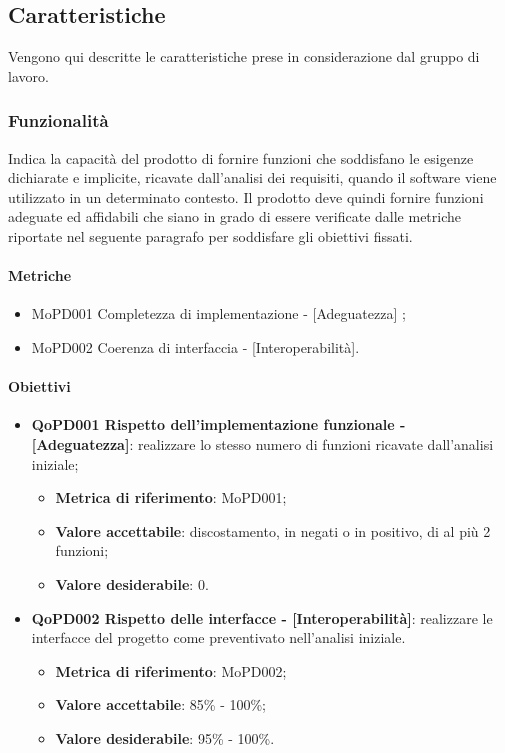 \documentclass[../piano-di-qualifica.tex]{subfiles}
\begin{document}
\subsection{Caratteristiche}%
\label{sub:caratteristiche}
Vengono qui descritte le caratteristiche prese in considerazione dal gruppo di lavoro.

\subsubsection{Funzionalità}%
\label{sub:funzionalita}
Indica la capacità del prodotto di fornire funzioni che soddisfano le esigenze dichiarate e implicite, ricavate dall'analisi dei requisiti, quando il software viene utilizzato in un determinato contesto.
Il prodotto deve quindi fornire funzioni adeguate ed affidabili che siano in grado di essere verificate dalle metriche riportate nel seguente paragrafo per soddisfare gli obiettivi fissati.

\paragraph{Metriche}
\label{sub:metriche}
\begin{itemize}
    \item MoPD001 Completezza di implementazione - [Adeguatezza] ;
    \item MoPD002 Coerenza di interfaccia - [Interoperabilità].
\end{itemize}

\paragraph{Obiettivi}
\label{sub:obiettivi}
\begin{itemize}
    \item \textbf{QoPD001 Rispetto dell'implementazione funzionale - [Adeguatezza]}: realizzare lo stesso numero di funzioni ricavate dall'analisi iniziale;
        \begin{itemize}
            \item \textbf{Metrica di riferimento}: MoPD001;
            \item \textbf{Valore accettabile}: discostamento, in negati o in positivo, di al più 2 funzioni;
            \item \textbf{Valore desiderabile}: 0.
        \end{itemize}
    \item \textbf{QoPD002 Rispetto delle interfacce - [Interoperabilità]}: realizzare le interfacce del progetto come preventivato nell'analisi iniziale.
        \begin{itemize}
            \item \textbf{Metrica di riferimento}: MoPD002;
            \item \textbf{Valore accettabile}: 85\% - 100\%;
            \item \textbf{Valore desiderabile}: 95\% - 100\%.
        \end{itemize}
\end{itemize}
\end{document}
